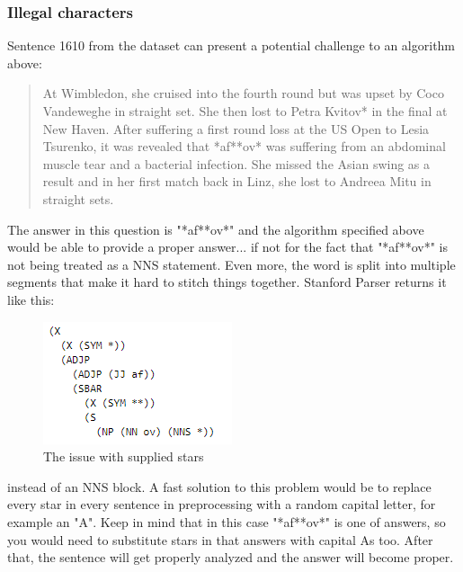 \documentclass{article}
\begin{document}
\subsubsection{Illegal characters}
Sentence 1610 from the dataset can present a potential challenge to an algorithm above:
\begin{quote}
    At Wimbledon, she cruised into the fourth round but was upset by Coco Vandeweghe in straight set. She then lost to Petra Kvitov* in the final at New Haven. After suffering a first round loss at the US Open to Lesia Tsurenko, it was revealed that *af**ov* was suffering from an abdominal muscle tear and a bacterial infection. She missed the Asian swing as a result and in her first match back in Linz, she lost to Andreea Mitu in straight sets.	
\end{quote}
The answer in this question is "*af**ov*" and the algorithm specified above would be able to provide a proper answer... if not for the fact that "*af**ov*" is not being treated as a NNS statement. Even more, the word is split into multiple segments that make it hard to stitch things together. Stanford Parser returns it like this:
\begin{figure}[h!]
    \centering
\includegraphics[]{Example3.png}
    \caption{The issue with supplied stars}
\end{figure}
instead of an NNS block. A fast solution to this problem would be to replace every star in every sentence in preprocessing with a random capital letter, for example an "A". Keep in mind that in this case "*af**ov*" is one of answers, so you would need to substitute stars in that answers with capital As too. After that, the sentence will get properly analyzed and the answer will become proper. \\ \\
\newpage
\end{document}
